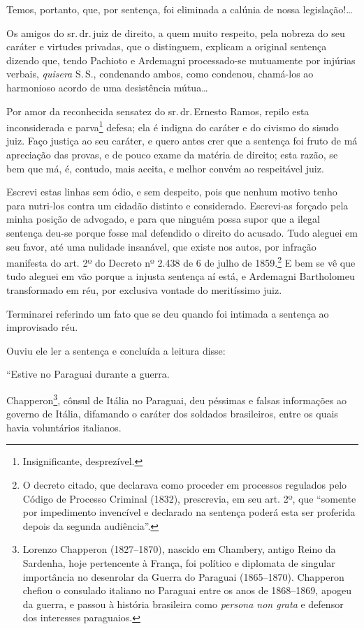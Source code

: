 Temos, portanto, que, por sentença, foi eliminada a calúnia de nossa
legislação!\ldots{}

Os amigos do sr.\,dr.\,juiz de direito, a quem muito respeito, pela
nobreza do seu caráter e virtudes privadas, que o distinguem, explicam a
original sentença dizendo que, tendo Pachioto e Ardemagni processado-se
mutuamente por injúrias verbais, \emph{quisera} S.\,S., condenando ambos,
como condenou, chamá-los ao harmonioso acordo de uma desistência
mútua\ldots{}

Por amor da reconhecida sensatez do sr.\,dr.\,Ernesto Ramos, repilo esta
inconsiderada e parva\footnote{ Insignificante, desprezível.} defesa;
ela é indigna do caráter e do civismo do sisudo juiz. Faço justiça ao
seu caráter, e quero antes crer que a sentença foi fruto de má
apreciação das provas, e de pouco exame da matéria de direito; esta
razão, se bem que má, é, contudo, mais aceita, e melhor convém ao
respeitável juiz.

Escrevi estas linhas sem ódio, e sem despeito, pois que nenhum motivo
tenho para nutri-los contra um cidadão distinto e considerado.
Escrevi-as forçado pela minha posição de advogado, e para que ninguém
possa supor que a ilegal sentença deu-se porque fosse mal defendido o
direito do acusado. Tudo aleguei em seu favor, até uma nulidade
insanável, que existe nos autos, por infração manifesta do art. 2º do
Decreto nº 2.438 de 6 de julho de 1859.\footnote{ O decreto citado, que
  declarava como proceder em processos regulados pelo Código de Processo
  Criminal (1832), prescrevia, em seu art. 2º, que ``somente por
  impedimento invencível e declarado na sentença poderá esta ser
  proferida depois da segunda audiência''.} E bem se vê que tudo aleguei
em vão porque a injusta sentença aí está, e Ardemagni Bartholomeu
transformado em réu, por exclusiva vontade do meritíssimo juiz.

Terminarei referindo um fato que se deu quando foi intimada a sentença
ao improvisado réu.

Ouviu ele ler a sentença e concluída a leitura disse:

``Estive no Paraguai durante a guerra.

Chapperon\footnote{ Lorenzo Chapperon (1827--1870), nascido em Chambery,
  antigo Reino da Sardenha, hoje pertencente à França, foi político e
  diplomata de singular importância no desenrolar da Guerra do Paraguai
  (1865--1870). Chapperon chefiou o consulado italiano no Paraguai entre
  os anos de 1868--1869, apogeu da guerra, e passou à história brasileira
  como \emph{persona non grata} e defensor dos interesses paraguaios.},
cônsul de Itália no Paraguai, deu péssimas e falsas informações ao
governo de Itália, difamando o caráter dos soldados brasileiros, entre
os quais havia voluntários italianos.

